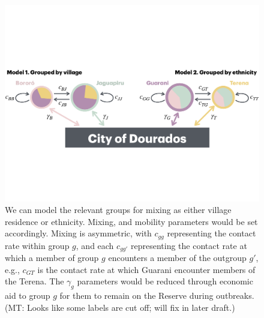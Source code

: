 \documentclass[
  letterpaper,
  abstract]{scrartcl}
\newcommand{\mt}[1]{{\textcolor{myorange} {({\tiny MT:} #1)}}}
\begin{document}
\begin{figure}[H]

\caption{
  We can model the relevant groups for mixing as either village
residence or ethnicity. Mixing, and mobility parameters
would be set accordingly. Mixing is asymmetric, with $c_{gg}$ representing the
contact rate within group $g$, and each $c_{gg'}$ representing
the contact rate at which a member of group $g$ encounters a member of the
outgroup $g'$, e.g., $c_{GT}$ is the contact rate at which Guarani encounter
members of the Terena. The $\gamma_g$ parameters would be reduced through
economic aid to group $g$ for them to remain on the Reserve during
outbreaks. \mt{Looks like some labels are cut off; will fix in later draft.}}
\label{fig:ModelSketch}
\vspace{0.3em}
{\centering \includegraphics{Figures/ModelSketch.pdf}

}
\end{figure}%







\end{document}
